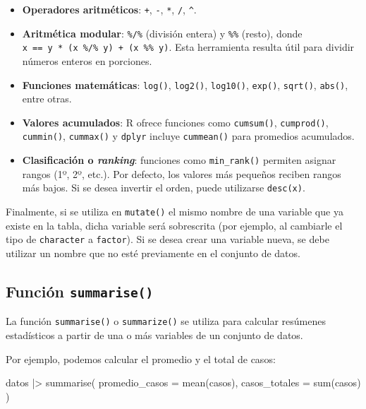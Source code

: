 \documentclass[
  spanish,
  letterpaper,
  DIV=11,
  numbers=noendperiod]{scrreprt}
\newenvironment{Shaded}{\begin{snugshade}}{\end{snugshade}}
\newcommand{\AttributeTok}[1]{\textcolor[rgb]{0.40,0.45,0.13}{#1}}
\newcommand{\FunctionTok}[1]{\textcolor[rgb]{0.28,0.35,0.67}{#1}}
\newcommand{\NormalTok}[1]{\textcolor[rgb]{0.00,0.23,0.31}{#1}}
\newcommand{\SpecialCharTok}[1]{\textcolor[rgb]{0.37,0.37,0.37}{#1}}
\begin{document}
\begin{itemize}
\item
  \textbf{Operadores aritméticos}: \texttt{+}, \texttt{-}, \texttt{*},
  \texttt{/}, \texttt{\^{}}.
\item
  \textbf{Aritmética modular}: \texttt{\%/\%} (división entera) y
  \texttt{\%\%} (resto), donde
  \texttt{x\ ==\ y\ *\ (x\ \%/\%\ y)\ +\ (x\ \%\%\ y)}. Esta herramienta
  resulta útil para dividir números enteros en porciones.
\item
  \textbf{Funciones matemáticas}: \texttt{log()}, \texttt{log2()},
  \texttt{log10()}, \texttt{exp()}, \texttt{sqrt()}, \texttt{abs()},
  entre otras.
\item
  \textbf{Valores acumulados}: R ofrece funciones como
  \texttt{cumsum()}, \texttt{cumprod()}, \texttt{cummin()},
  \texttt{cummax()} y \texttt{dplyr} incluye \texttt{cummean()} para
  promedios acumulados.
\item
  \textbf{Clasificación o \emph{ranking}}: funciones como
  \texttt{min\_rank()} permiten asignar rangos (1º, 2º, etc.). Por
  defecto, los valores más pequeños reciben rangos más bajos. Si se
  desea invertir el orden, puede utilizarse \texttt{desc(x)}.
\end{itemize}

Finalmente, si se utiliza en \texttt{mutate()} el mismo nombre de una
variable que ya existe en la tabla, dicha variable será sobrescrita (por
ejemplo, al cambiarle el tipo de \texttt{character} a \texttt{factor}).
Si se desea crear una variable nueva, se debe utilizar un nombre que no
esté previamente en el conjunto de datos.

\subsection{\texorpdfstring{Función
\texttt{summarise()}}{Función summarise()}}\label{funciuxf3n-summarise}

La función \texttt{summarise()} o \texttt{summarize()} se utiliza para
calcular resúmenes estadísticos a partir de una o más variables de un
conjunto de datos.

Por ejemplo, podemos calcular el promedio y el total de casos:

\begin{Shaded}
\begin{Highlighting}[]
\NormalTok{datos }\SpecialCharTok{|\textgreater{}}
  \FunctionTok{summarise}\NormalTok{(}
    \AttributeTok{promedio\_casos =} \FunctionTok{mean}\NormalTok{(casos),}
    \AttributeTok{casos\_totales =} \FunctionTok{sum}\NormalTok{(casos)}
\NormalTok{  )}
\end{Highlighting}
\end{Shaded}
\end{document}
